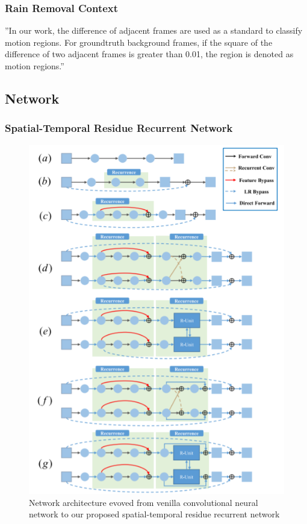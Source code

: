 \documentclass{article}
\begin{document}
\subsubsection{Rain Removal Context}
''In our work, the difference of adjacent frames are used as a standard to classify motion regions. For groundtruth background frames, if the square of the difference of two adjacent frames is greater than 0.01, the region is denoted as motion regions.''

\subsection{Network}
\subsubsection{Spatial-Temporal Residue Recurrent Network}
\begin{figure}[H]
\centering
\includegraphics[width=\linewidth]{D3RNET}
\caption{Network architecture evoved from venilla convolutional neural network to our proposed spatial-temporal residue recurrent network}
\end{figure}
\end{document}
